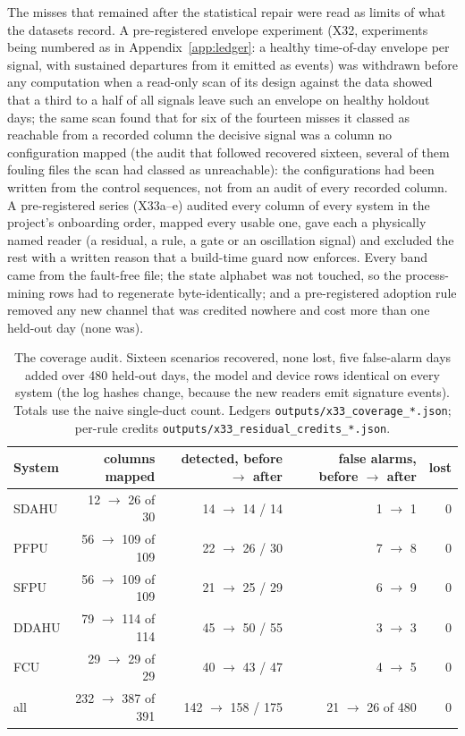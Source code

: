 \documentclass[11pt,letterpaper]{article}
\begin{document}
The misses that remained after the statistical repair were read as limits of what the datasets record. A pre-registered envelope experiment (X32, experiments being numbered as in Appendix~\ref{app:ledger}: a healthy time-of-day envelope per signal, with sustained departures from it emitted as events) was withdrawn before any computation when a read-only scan of its design against the data showed that a third to a half of all signals leave such an envelope on healthy holdout days; the same scan found that for six of the fourteen misses it classed as reachable from a recorded column the decisive signal was a column no configuration mapped (the audit that followed recovered sixteen, several of them fouling files the scan had classed as unreachable): the configurations had been written from the control sequences, not from an audit of every recorded column. A pre-registered series (X33a--e) audited every column of every system in the project's onboarding order, mapped every usable one, gave each a physically named reader (a residual, a rule, a gate or an oscillation signal) and excluded the rest with a written reason that a build-time guard now enforces. Every band came from the fault-free file; the state alphabet was not touched, so the process-mining rows had to regenerate byte-identically; and a pre-registered adoption rule removed any new channel that was credited nowhere and cost more than one held-out day (none was).

\begin{table}[htbp]
\centering
\caption{The coverage audit. Sixteen scenarios recovered, none lost, five false-alarm days added over 480 held-out days, the model and device rows identical on every system (the log hashes change, because the new readers emit signature events). Totals use the naive single-duct count. Ledgers \texttt{outputs/x33\_coverage\_*.json}; per-rule credits \texttt{outputs/x33\_residual\_credits\_*.json}.}
\label{tab:coverage}
\small
\begin{tabular}{@{}lrrrr@{}}
\hline
System & columns mapped & detected, before $\to$ after & false alarms, before $\to$ after & lost \\
\hline
SDAHU & 12 $\to$ 26 of 30 & 14 $\to$ 14 / 14 & 1 $\to$ 1 & 0 \\
PFPU & 56 $\to$ 109 of 109 & 22 $\to$ 26 / 30 & 7 $\to$ 8 & 0 \\
SFPU & 56 $\to$ 109 of 109 & 21 $\to$ 25 / 29 & 6 $\to$ 9 & 0 \\
DDAHU & 79 $\to$ 114 of 114 & 45 $\to$ 50 / 55 & 3 $\to$ 3 & 0 \\
FCU & 29 $\to$ 29 of 29 & 40 $\to$ 43 / 47 & 4 $\to$ 5 & 0 \\
\hline
all & 232 $\to$ 387 of 391 & 142 $\to$ 158 / 175 & 21 $\to$ 26 of 480 & 0 \\
\hline
\end{tabular}

\end{table}
\end{document}
